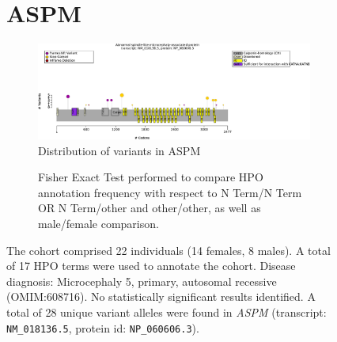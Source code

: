 \begin{figure}[htbp]
\section*{ASPM}
\centering
\begin{subfigure}[b]{0.95\textwidth}
\centering
\includegraphics[width=\textwidth]{ img/ASPM_protein_diagram.pdf} 
\captionsetup{justification=raggedright,singlelinecheck=false}
\caption{Distribution of variants in ASPM}
\end{subfigure}

\vspace{2em}

\begin{subfigure}[b]{0.95\textwidth}
\centering
{}
\captionsetup{justification=raggedright,singlelinecheck=false}
\caption{Fisher Exact Test performed to compare HPO annotation frequency with respect to N Term/N Term OR N Term/other and other/other, as well as male/female comparison. }
\end{subfigure}

\vspace{2em}

\caption{ The cohort comprised 22 individuals (14 females, 8 males). A total of 17 HPO terms were used to annotate the cohort. Disease diagnosis: Microcephaly 5, primary, autosomal recessive (OMIM:608716). No statistically significant results identified. A total of 28 unique variant alleles were found in \textit{ASPM} (transcript: \texttt{NM\_018136.5}, protein id: \texttt{NP\_060606.3}).}
\end{figure}
